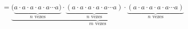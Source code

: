 \documentclass[preview]{standalone}
\begin{document}
\begin{align*}
=\underbrace{(\underbrace{a \cdot a \cdot a \cdot a \cdot a \cdots a)}_{n \text{ vezes}}\cdot\underbrace{(a \cdot a \cdot a \cdot a \cdot a \cdots a)}_{n \text{ vezes}}\cdot\underbrace{(a \cdot a \cdot a \cdot a \cdot a \cdots a)}_{n \text{ vezes}}}_{m \text{ vezes}}
\end{align*}
\end{document}
